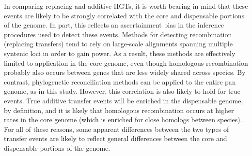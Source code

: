 \documentclass[12pt]{article}
\begin{document}





In comparing replacing and additive HGTs, it is worth bearing in mind that
these events are likely to be strongly correlated with the core and
dispensable portions of the genome.  In part, this reflects an
ascertainment bias in the inference procedures used to detect these events.
Methods for detecting recombination (replacing transfers) tend to rely on
large-scale alignments spanning multiple syntenic loci in order to gain
power.  As a result, these methods are effectively limited to application
in the core genome, even though homologous recombination probably also
occurs between genes that are less widely shared across species.  By
contrast, phylogenetic reconciliation methods can be applied to the entire
pan genome, as in this study.  However, this correlation is also likely to
hold for true events.  True additive transfer events will be enriched in
the dispensable genome, by definition, and it is likely that homologous
recombination occurs at higher rates in the core genome (which is enriched
for close homologs between species).  For all of these reasons, some
apparent differences between the two types of transfer events are likely to
reflect general differences between the core and dispensable portions of
the genome.
\end{document}
